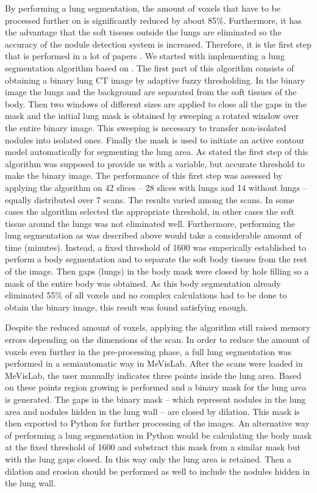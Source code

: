 By performing a lung segmentation, the amount of voxels that have to be
processed further on is significantly reduced by about 85\%. Furthermore, it has
the advantage that the soft tissues outside the lungs are eliminated so the
accuracy of the nodule detection system is increased. Therefore, it is the first
step that is performed in a lot of papers \cite{keshani, elbaz, teramoto}. We
started with implementing a lung segmentation algorithm based on \cite{keshani}.
The first part of this algorithm consists of obtaining a binary lung CT image by
adaptive fuzzy thresholding. In the binary image the lungs and the background
are separated from the soft tissues of the body.
Then two windows of different sizes are applied to close all the gaps in the
mask and the initial lung mask is obtained by sweeping a rotated window over the
entire binary image.
This sweeping is necessary to transfer non-isolated nodules into isolated ones.
Finally the mask is used to initiate an active contour model automatically for
segmenting the lung area. As stated the first step of this algorithm was
supposed to provide us with a variable, but accurate threshold to make the
binary image. The performance of this first step was assessed by applying the
algorithm on 42 slices -- 28 slices with lungs and 14 without lungs -- equally
distributed over 7 scans. The results varied among the scans. In some cases the
algorithm selected the appropriate threshold, in other cases the soft tissue
around the lungs was not eliminated well. Furthermore, performing the lung
segmentation as was described above would take a considerable amount of time
(minutes). Instead, a fixed threshold of 1600 was emperically established to
perform a body segmentation and to separate the soft body tissues from the rest
of the image. Then gaps (lungs) in the body mask were closed by hole filling so
a mask of the entire body was obtained. As this body segmentation already
eliminated 55\% of all voxels and no complex calculations had to be done to
obtain the binary image, this result was found satisfying enough.

Despite the reduced amount of voxels, applying the algorithm still raised
memory errors depending on the dimensions of the scan.
In order to reduce the amount of voxels even further in the pre-processing
phase, a full lung segmentation was performed in a semiautomatic way in
MeVisLab. After the scans were loaded in MeVisLab, the user manually indicates
three points inside the lung area. Based on these points region growing is
performed and a binary mask for the lung area is generated. The gaps in the
binary mask -- which represent nodules in the lung area and nodules hidden in
the lung wall -- are closed by dilation. This mask is then exported to Python
for further processing of the images. An alternative way of performing a lung
segmentation in Python would be calculating the body mask at the fixed
threshold of 1600 and substract this mask from a similar mask but with the lung
gaps closed. In this way only the lung area is retained. Then a dilation and
erosion should be performed as well to include the nodules hidden in the lung
wall.

